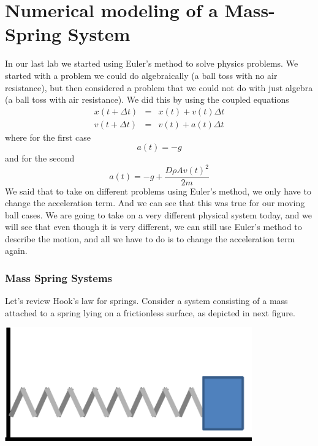 \documentclass[twoside,11pt,ShortChapTitles]{BYUTextbook}
\begin{document}
\chapter{Numerical modeling of a Mass-Spring System}

In our last lab we started using Euler's method to solve physics problems.
We started with a problem we could do algebraically (a ball toss with no air
resistance), but then considered a problem that we could not do with just
algebra (a ball toss with air resistance). We did this by using the coupled
equations 
\begin{eqnarray*}
x(t+\Delta t) &=&x(t)+v(t)\Delta t \\
v(t+\Delta t) &=&v(t)+a\left( t\right) \Delta t
\end{eqnarray*}%
where for the first case 
\[
a\left( t\right) =-g 
\]%
and for the second 
\[
a\left( t\right) =-g+\frac{D\rho Av(t)^{2}}{2m} 
\]%
We said that to take on different problems using Euler's method, we only
have to change the acceleration term. And we can see that this was true for
our moving ball cases. We are going to take on a very different physical
system today, and we will see that even though it is very different, we can
still use Euler's method to describe the motion, and all we have to do is to
change the acceleration term again.

\subsection{Mass Spring Systems}

Let's review Hook's law for springs. Consider a system consisting of a mass
attached to a spring lying on a frictionless surface, as depicted in next
figure.

\bigskip

\begin{center}
\includegraphics[width=0.8\textwidth]{Lab8_figs/mass_on_spring.pdf}
\end{center}
\end{document}
